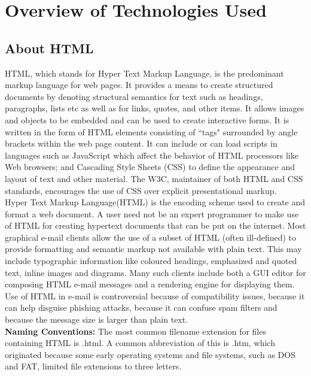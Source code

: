 \documentclass[12pt,a4 paper]{report}
\begin{document}
\chapter{Overview of Technologies Used}

\section{About HTML}
HTML, which stands for Hyper Text Markup Language, is the predominant markup language for web pages. It provides a means to create structured documents by denoting structural semantics for text such as headings, paragraphs, lists etc as well as for links, quotes, and other items. It allows images and objects to be embedded and can be used to create interactive forms. It is written in the form of HTML elements consisting of ``tags" surrounded by angle brackets within the web page content. It can include or can load scripts in languages such as JavaScript which affect the behavior of HTML processors like Web browsers; and Cascading Style Sheets (CSS) to define the appearance and layout of text and other material. The W3C, maintainer of both HTML and CSS standards, encourages the use of CSS over explicit presentational markup.\\

Hyper Text Markup Language(HTML) is the encoding scheme used to create and format a web document. A user need not be an expert programmer to make use of HTML for creating hypertext documents that can be put on the internet. Most graphical e-mail clients allow the use of a subset of HTML (often ill-defined) to provide formatting and semantic markup not available with plain text. This may include typographic information like coloured headings, emphasized and quoted text, inline images and diagrams. Many such clients include both a GUI editor for composing HTML e-mail messages and a rendering engine for displaying them. Use of HTML in e-mail is controversial because of compatibility issues, because it can help disguise phishing attacks, because it can confuse spam filters and because the message size is larger than plain text.\\

\noindent \textbf{Naming Conventions:}
The most common filename extension for files containing HTML is .html. A common abbreviation of this is .htm, which originated because some early operating systems and file systems, such as DOS and FAT, limited file extensions to three letters.\\
\end{document}
